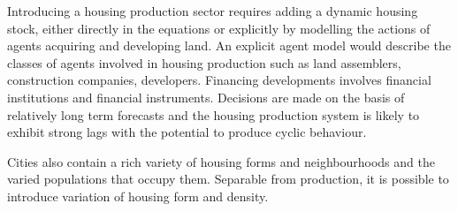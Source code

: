 Introducing a housing production sector requires adding a dynamic housing stock, either directly in the equations or explicitly by modelling the actions of agents acquiring and developing land. %
 An explicit agent model would describe the classes of agents involved in housing production such as land assemblers, construction companies, developers. 
Financing developments involves financial institutions and financial instruments. Decisions are made on the basis of relatively long term forecasts and the housing production system is likely to exhibit strong lags with the potential to produce cyclic behaviour.




Cities also contain a rich variety of housing forms and neighbourhoods and the varied populations that occupy them. Separable from production, it is possible to introduce variation of housing form and density.  %

